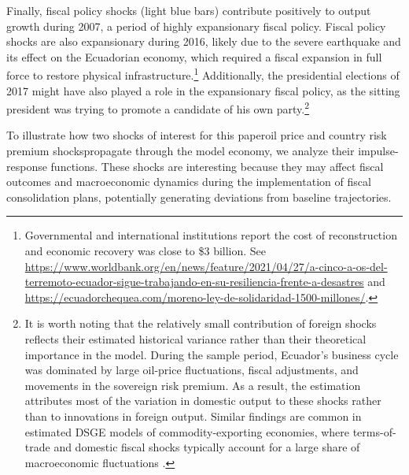 \documentclass[12pt]{article}
\begin{document}
Finally, fiscal policy shocks (light blue bars) contribute positively to output growth during 2007, a period of highly expansionary fiscal policy. Fiscal policy shocks are also expansionary during 2016, likely due to the severe earthquake and its effect on the Ecuadorian economy, which required a fiscal expansion in full force to restore physical infrastructure.\footnote{Governmental and international institutions report the cost of reconstruction and economic recovery was close to \$3 billion. See \url{https://www.worldbank.org/en/news/feature/2021/04/27/a-cinco-a-os-del-terremoto-ecuador-sigue-trabajando-en-su-resiliencia-frente-a-desastres} and \url{https://ecuadorchequea.com/moreno-ley-de-solidaridad-1500-millones/}.} Additionally, the presidential elections of 2017 might have also played a role in the expansionary fiscal policy, as the sitting president was trying to promote a candidate of his own party.\footnote{It is worth noting that the relatively small contribution of foreign shocks reflects their estimated historical variance rather than their theoretical importance in the model. During the sample period, Ecuador’s business cycle was dominated by large oil-price fluctuations, fiscal adjustments, and movements in the sovereign risk premium. As a result, the estimation attributes most of the variation in domestic output to these shocks rather than to innovations in foreign output. Similar findings are common in estimated DSGE models of commodity-exporting economies, where terms-of-trade and domestic fiscal shocks typically account for a large share of macroeconomic fluctuations \citep[see][for instance]{MedinaSoto2016, MelinaYangZanna2016}.}

To illustrate how two shocks of interest for this paper\textemdash oil price and country risk premium shocks\textemdash propagate through the model economy, we analyze their impulse-response functions. These shocks are interesting because they may affect fiscal outcomes and macroeconomic dynamics during the implementation of fiscal consolidation plans, potentially generating deviations from baseline trajectories.

\end{document}
